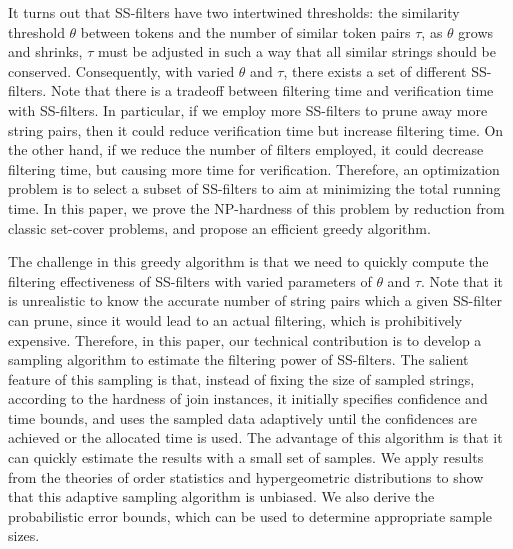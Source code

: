   It turns out that SS-filters have two intertwined thresholds: the similarity threshold $\theta$ between tokens  and the number of similar token pairs $\tau$, as $\theta$ grows and shrinks, $\tau$ must be  adjusted
in such a way that all similar strings should be conserved. Consequently, with varied  $\theta$ and $\tau$, there exists a set of different SS-filters. Note that there is a tradeoff between filtering time and verification time with SS-filters. In particular, if we employ more SS-filters to prune away more string pairs, then  it could reduce verification time but increase filtering time. On the other hand, if we reduce the number of filters employed, it could decrease filtering time, but causing more time for verification. Therefore,  an optimization problem is to select a subset of SS-filters to aim at minimizing the total running time. In this paper, we prove the NP-hardness of this problem by reduction from classic set-cover problems, and propose an efficient greedy algorithm.


The challenge in this greedy  algorithm is that we need to quickly
compute the filtering effectiveness of SS-filters with varied
parameters of $\theta$ and $\tau$. Note that it is unrealistic to know
the accurate number of string pairs which a given SS-filter can prune,
since it would lead to an actual filtering, which is
prohibitively expensive. Therefore, in
this paper, our technical contribution is to develop a 
sampling algorithm to estimate the filtering power
of SS-filters. The salient feature of this sampling is that, instead of fixing the size of sampled strings, according to the hardness of join instances, it initially specifies confidence and time bounds, and  uses the sampled data adaptively until the confidences are achieved or the allocated time is used. The advantage of this algorithm is that it can quickly estimate the results  with a small set of samples.  We apply results from the theories of order statistics \cite{journals/jcss/Cohen97} and hypergeometric distributions \cite{conf/sigmod/BeyerHRSG07} to show that this adaptive sampling algorithm is unbiased. We also derive the probabilistic error bounds, which can be used to determine appropriate sample sizes.
 

